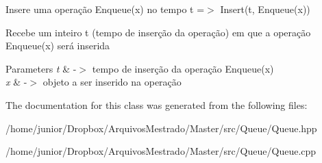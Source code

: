 Insere uma operação Enqueue(x) no tempo t =$>$ Insert(t, Enqueue(x))

Recebe um inteiro t (tempo de inserção da operação) em que a operação Enqueue(x) será inserida


\begin{DoxyParams}{Parameters}
{\em t} & -\/$>$ tempo de inserção da operação Enqueue(x) \\
\hline
{\em x} & -\/$>$ objeto a ser inserido na operação \\
\hline
\end{DoxyParams}


The documentation for this class was generated from the following files\+:\begin{DoxyCompactItemize}
\item 
/home/junior/\+Dropbox/\+Arquivos\+Mestrado/\+Master/src/\+Queue/Queue.\+hpp\item 
/home/junior/\+Dropbox/\+Arquivos\+Mestrado/\+Master/src/\+Queue/Queue.\+cpp\end{DoxyCompactItemize}
